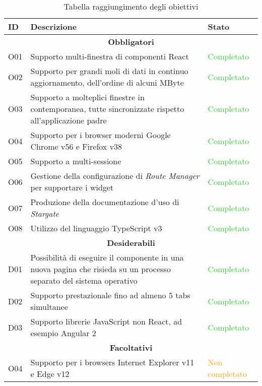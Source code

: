 \begin{table}[H]
\small
\begin{tabular}{ |p{1cm} |p{9cm}| p{2cm}|}
\hline
\textbf{ID} & \textbf{Descrizione} & \textbf{Stato} \\ \hline

\multicolumn{3}{|c|}{\textbf{Obbligatori}} \\ \hline

O01 & Supporto multi-finestra di componenti React & \textcolor{LimeGreen}{Completato} \\ \hline
O02 & Supporto per grandi moli di dati in continuo aggiornamento, dell'ordine di alcuni MByte & \textcolor{LimeGreen}{Completato} \\ \hline
O03 & Supporto a molteplici finestre in contemporanea, tutte sincronizzate rispetto all'applicazione padre & \textcolor{LimeGreen}{Completato} \\ \hline
O04 & Supporto per i browser moderni Google Chrome v56 e Firefox v38 & \textcolor{LimeGreen}{Completato} \\ \hline
O05 & Supporto a multi-sessione & \textcolor{LimeGreen}{Completato} \\ \hline
O06 & Gestione della configurazione di \textit{Route Manager} per supportare i widget & \textcolor{LimeGreen}{Completato} \\ \hline
O07 & Produzione della documentazione d'uso di \textit{Stargate} & \textcolor{LimeGreen}{Completato} \\ \hline
O08 & Utilizzo del linguaggio TypeScript v3 & \textcolor{LimeGreen}{Completato} \\ \hline

\multicolumn{3}{|c|}{\textbf{Desiderabili}} \\ \hline

D01 & Possibilità di eseguire il componente in una nuova pagina che risieda su un processo separato del sistema operativo & \textcolor{LimeGreen}{Completato} \\ \hline
D02 & Supporto prestazionale fino ad almeno 5 tabs simultanee & \textcolor{LimeGreen}{Completato} \\ \hline
D03 & Supporto librerie JavaScript non React, ad esempio Angular 2 & \textcolor{LimeGreen}{Completato} \\ \hline

\multicolumn{3}{|c|}{\textbf{Facoltativi}} \\ \hline

O04 & Supporto per i browsers Internet Explorer v11 e Edge v12 & \textcolor{Orange}{Non completato} \\ \hline

\end{tabular}
\caption{Tabella raggiungimento degli obiettivi}
\end{table}

